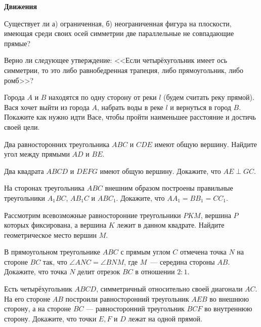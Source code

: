 \documentclass{article}
\begin{document}
    \large

    \begin{center}
        \textbf{Движения}
    \end{center}

    \begin{enumerate_boxed}

        \item Существует ли а) ограниченная, б) неограниченная фигура на плоскости, имеющая среди своих осей симметрии две параллельные не совпадающие прямые?

        \item Верно ли следующее утверждение: <<Если четырёхугольник имеет ось симметрии, то это либо равнобедренная трапеция, либо прямоугольник, либо ромб>>?

        \item Города $A$ и $B$ находятся по одну сторону от реки $l$ (будем считать реку прямой).
        Вася хочет выйти из города $A$, набрать воды в реке $l$ и вернуться в город $B$.
        Покажите как нужно идти Васе, чтобы пройти наименьшее расстояние и достичь своей цели.

        \item Два равносторонних треугольника $ABC$ и $CDE$ имеют общую вершину.
        Найдите угол между прямыми $AD$ и $BE$.

        \item Два квадрата $ABCD$ и $DEFG$ имеют общую вершину.
        Докажите, что $AE \perp GC$.

        \item На сторонах треугольника $ABC$ внешним образом построены правильные треугольники $A_{1}BC$, $AB_{1}C$ и $ABC_1$.
        Докажите, что $AA_1 = BB_1 = CC_1$.

        \item Рассмотрим всевозможные равносторонние треугольники $PKM$, вершина $P$ которых фиксирована, а вершина $K$ лежит в данном квадрате.
        Найдите геометрическое место вершин $M$.

        \item В прямоугольном треугольнике $ABC$ с прямым углом $C$ отмечена точка $N$ на стороне $BC$ так, что $\angle ANC=\angle BNM$, где $M$~--- середина стороны $AB$.
        Докажите, что точка $N$ делит отрезок $BC$ в отношении $2:1$.

        \item Есть четырёхугольник $ABCD$, симметричный относительно своей диагонали $AC$.
        На его стороне $AB$ построили равносторонний треугольник $AEB$ во внешнюю сторону, а на стороне $BC$ — равносторонний треугольник $BCF$ во внутреннюю сторону.
        Докажите, что точки $E, F$ и $D$ лежат на одной прямой.


\end{enumerate_boxed}
\end{document}
